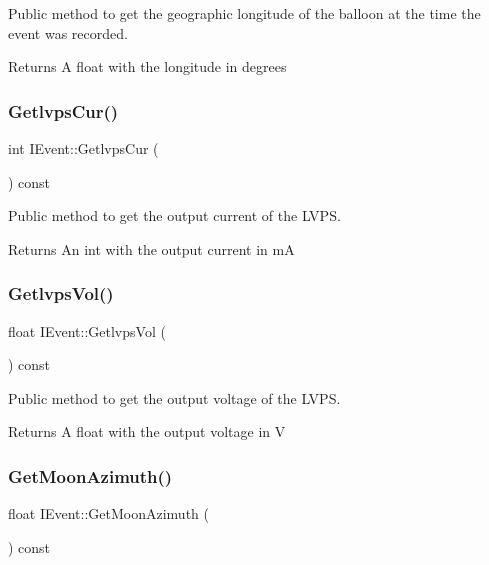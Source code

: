 Public method to get the geographic longitude of the balloon at the time the event was recorded. 

\begin{DoxyReturn}{Returns}
A float with the longitude in degrees 
\end{DoxyReturn}
\mbox{\label{classIEvent_ab00b517486f005b0eef9f38c39ab3bdf}} 
\subsubsection{\texorpdfstring{Getlvps\+Cur()}{GetlvpsCur()}}
{\footnotesize\ttfamily int I\+Event\+::\+Getlvps\+Cur (\begin{DoxyParamCaption}{ }\end{DoxyParamCaption}) const}



Public method to get the output current of the L\+V\+PS. 

\begin{DoxyReturn}{Returns}
An int with the output current in mA 
\end{DoxyReturn}
\mbox{\label{classIEvent_add6c647d8ed43c3c54fc3f6948600abc}} 
\subsubsection{\texorpdfstring{Getlvps\+Vol()}{GetlvpsVol()}}
{\footnotesize\ttfamily float I\+Event\+::\+Getlvps\+Vol (\begin{DoxyParamCaption}{ }\end{DoxyParamCaption}) const}



Public method to get the output voltage of the L\+V\+PS. 

\begin{DoxyReturn}{Returns}
A float with the output voltage in V 
\end{DoxyReturn}
\mbox{\label{classIEvent_a0e07e2093f44fe582dbf0ac2edc2be1e}} 
\subsubsection{\texorpdfstring{Get\+Moon\+Azimuth()}{GetMoonAzimuth()}}
{\footnotesize\ttfamily float I\+Event\+::\+Get\+Moon\+Azimuth (\begin{DoxyParamCaption}{ }\end{DoxyParamCaption}) const}



